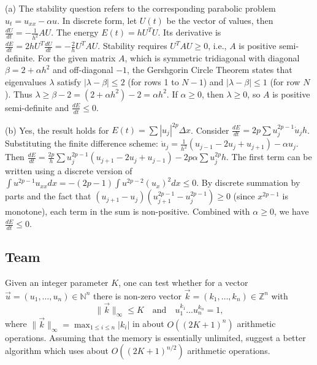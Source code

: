 \begin{solution}
(a) The stability question refers to the corresponding parabolic problem $u_t = u_{xx} - \alpha u$. In discrete form, let $U(t)$ be the vector of values, then $\frac{dU}{dt} = - \frac{1}{h^2} A U$. 
The energy $E(t) = h U^T U$. Its derivative is $\frac{dE}{dt} = 2h U^T \frac{dU}{dt} = -\frac{2}{h} U^T A U$.
Stability requires $U^T A U \geq 0$, i.e., $A$ is positive semi-definite.
For the given matrix $A$, which is symmetric tridiagonal with diagonal $\beta = 2 + \alpha h^2$ and off-diagonal $-1$, the Gershgorin Circle Theorem states that eigenvalues $\lambda$ satisfy $|\lambda - \beta| \leq 2$ (for rows 1 to $N-1$) and $|\lambda - \beta| \leq 1$ (for row $N$).
Thus $\lambda \geq \beta - 2 = (2 + \alpha h^2) - 2 = \alpha h^2$.
If $\alpha \geq 0$, then $\lambda \geq 0$, so $A$ is positive semi-definite and $\frac{dE}{dt} \leq 0$.

(b) Yes, the result holds for $E(t) = \sum |u_j|^{2p} \Delta x$.
Consider $\frac{dE}{dt} = 2p \sum u_j^{2p-1} \dot{u}_j h$. Substituting the finite difference scheme:
$\dot{u}_j = \frac{1}{h^2}(u_{j-1} - 2u_j + u_{j+1}) - \alpha u_j$.
Then $\frac{dE}{dt} = \frac{2p}{h} \sum u_j^{2p-1} (u_{j+1} - 2u_j + u_{j-1}) - 2p \alpha \sum u_j^{2p} h$.
The first term can be written using a discrete version of $\int u^{2p-1} u_{xx} dx = -(2p-1) \int u^{2p-2} (u_x)^2 dx \leq 0$.
By discrete summation by parts and the fact that $(u_{j+1}-u_j)(u_{j+1}^{2p-1} - u_j^{2p-1}) \geq 0$ (since $x^{2p-1}$ is monotone), each term in the sum is non-positive. Combined with $\alpha \geq 0$, we have $\frac{dE}{dt} \leq 0$.
\end{solution}



\subsection{Team}

\begin{exercise}
\label{applied:2017:6}
Given an integer parameter $K$, one can test whether for a vector $\vec{u} = (u_1, \dots, u_n) \in \mathbb{N}^n$ there is non-zero vector $\vec{k} = (k_1, \ldots, k_n) \in \mathbb{Z}^n$ with
\[
\|\vec{k}\|_\infty \leq K \quad \text{and} \quad u_1^{k_1} \dots u_n^{k_n} = 1,
\]
where $\|\vec{k}\|_\infty = \max_{1 \leq i \leq n} |k_i|$ in about $O((2K+1)^n)$ arithmetic operations.
Assuming that the memory is essentially unlimited, suggest a better algorithm which uses about $O((2K+1)^{n/2})$ arithmetic operations.
\end{exercise}

